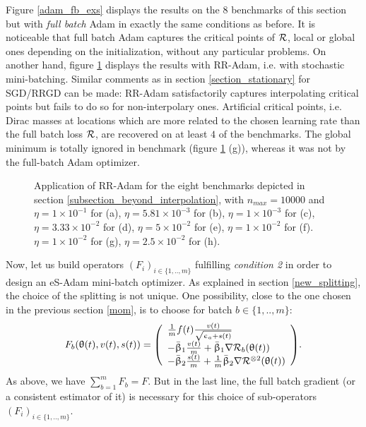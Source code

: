 \documentclass[article,authoryear,jmlmc]{beg_32}             %
\begin{document}
Figure \ref{adam_fb_exs} displays the results on the 8 benchmarks of this section but with {\em full batch} Adam in exactly the same conditions as before.  
It is noticeable that full batch Adam captures the critical points of $\mathcal{R}$, local or global ones depending on the initialization, without any particular problems.  
On another hand, figure \ref{rr_adam_exs} displays the results with RR-Adam, i.e. with stochastic mini-batching. Similar comments as in section \ref{section_stationary} for
SGD/RRGD can be made: RR-Adam satisfactorily captures interpolating critical points but fails to do so for non-interpolary ones. Artificial critical points, i.e. Dirac masses at
locations which are more related to the chosen learning rate than the full batch loss $\mathcal{R}$, are recovered on at least $4$ of the benchmarks. The global minimum is totally ignored in
benchmark \exSeven (figure \ref{rr_adam_exs} (g)), whereas it was not by the full-batch Adam optimizer. 
\begin{figure}[h!]
	\centering
	\scalebox{0.60}{}
        \caption{
          Application of RR-Adam for the eight benchmarks depicted in section \ref{subsection_beyond_interpolation}, with $n_{max}=10000$ and
 $\eta = 1   \times 10^{-1}$  for \exOne    (a),
 $\eta = 5.81\times 10^{-3}$  for \exTwo    (b),
 $\eta = 1   \times 10^{-3}$  for \exThree  (c),
 $\eta = 3.33\times 10^{-2}$  for \exFour   (d),
 $\eta = 5   \times 10^{-2}$  for \exFive   (e),
 $\eta = 1   \times 10^{-2}$  for \exSix    (f).
 $\eta = 1   \times 10^{-2}$  for \exSeven  (g),
 $\eta = 2.5 \times 10^{-2}$  for \exHeight (h).
}
	\label{rr_adam_exs}
\end{figure}


Now, let us build operators $(F_i)_{i\in\{1,..,m\}}$ fulfilling {\em condition 2} in order to design an eS-Adam mini-batch optimizer.
As explained in section \ref{new_splitting}, the choice of the splitting is not unique. 
One possibility, close to the one chosen in the previous section \ref{mom}, is to choose for batch $b\in\{1,..,m\}$:
\begin{eqnarray}
\label{F_j_adam_1}
F_b(\theta(t),v(t),s(t))=\left(\begin{array}{l}
  \frac{1}{m}f(t) \frac{v(t)}{\sqrt{\epsilon_a+s(t)}}\\
     -\bar{\beta}_1 \frac{v(t)}{m}+\bar{\beta}_1\nR_b(\theta(t))\\
     -\bar{\beta}_2 \frac{s(t)}{m}+\frac{1}{m}\bar{\beta}_2\nR^{\otimes 2}(\theta(t))\\
  \end{array}\right).
\end{eqnarray}
As above, we have $\sum_{b=1}^m F_b=F$. But in the last line, the full batch gradient (or a consistent estimator of it) is necessary for this choice of sub-operators $(F_i)_{i\in\{1,..,m\}}$. 
\end{document}
